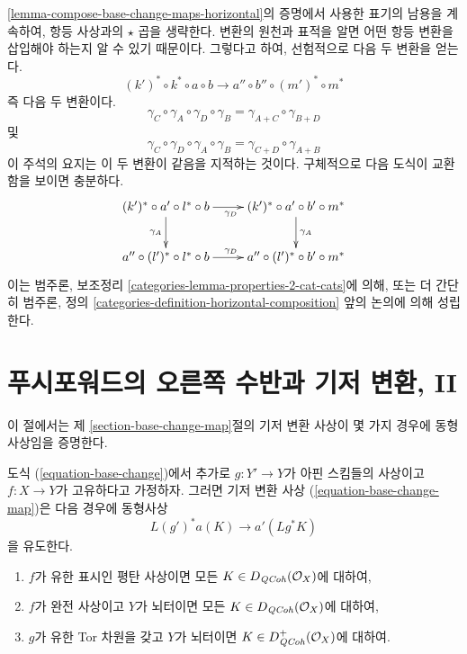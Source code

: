 \begin{remark}
\ref{lemma-compose-base-change-maps-horizontal}의 증명에서 사용한
표기의 남용을 계속하여, 항등 사상과의 $\star$ 곱을 생략한다.
변환의 원천과 표적을 알면 어떤 항등 변환을 삽입해야 하는지
알 수 있기 때문이다.
그렇다고 하여, 선험적으로 다음 두 변환을 얻는다.
$$
(k')^* \circ k^* \circ a \circ b
\longrightarrow
a'' \circ b'' \circ (m')^* \circ m^*
$$
즉 다음 두 변환이다.
$$
\gamma_C \circ \gamma_A \circ \gamma_D \circ \gamma_B =
\gamma_{A + C} \circ \gamma_{B + D}
$$
및
$$
\gamma_C \circ \gamma_D \circ \gamma_A \circ \gamma_B =
\gamma_{C + D} \circ \gamma_{A + B}
$$
이 주석의 요지는 이 두 변환이 같음을 지적하는 것이다. 구체적으로
다음 도식이 교환함을 보이면 충분하다.
$$
\xymatrix{
(k')^* \circ a' \circ l^* \circ b \ar[r]_{\gamma_D} \ar[d]_{\gamma_A} &
(k')^* \circ a' \circ b' \circ m^* \ar[d]^{\gamma_A} \\
a'' \circ (l')^* \circ l^* \circ b \ar[r]^{\gamma_D} &
a'' \circ (l')^* \circ b' \circ m^*
}
$$
이는 범주론, 보조정리 \ref{categories-lemma-properties-2-cat-cats}에 의해,
또는 더 간단히 범주론, 정의
\ref{categories-definition-horizontal-composition} 앞의 논의에 의해
성립한다.
\end{remark}
\section{푸시포워드의 오른쪽 수반과 기저 변환, II}
\label{section-base-change-II}

\noindent
이 절에서는 제 \ref{section-base-change-map}절의 기저 변환 사상이
몇 가지 경우에 동형사상임을 증명한다.

\begin{lemma}
\label{lemma-more-base-change}
도식 (\ref{equation-base-change})에서 추가로
$g : Y' \to Y$가 아핀 스킴들의 사상이고 $f : X \to Y$가 고유하다고
가정하자. 그러면 기저 변환 사상 (\ref{equation-base-change-map})은
다음 경우에 동형사상
$$
L(g')^*a(K) \longrightarrow a'(Lg^*K)
$$
을 유도한다.
\begin{enumerate}
\item $f$가 유한 표시인 평탄 사상이면 모든
$K \in D_{\mathit{QCoh}}(\mathcal{O}_X)$에 대하여,
\item $f$가 완전 사상이고 $Y$가 뇌터이면 모든
$K \in D_{\mathit{QCoh}}(\mathcal{O}_X)$에 대하여,
\item $g$가 유한 Tor 차원을 갖고 $Y$가 뇌터이면
$K \in D_{\mathit{QCoh}}^+(\mathcal{O}_X)$에 대하여.
\end{enumerate}
\end{lemma}

